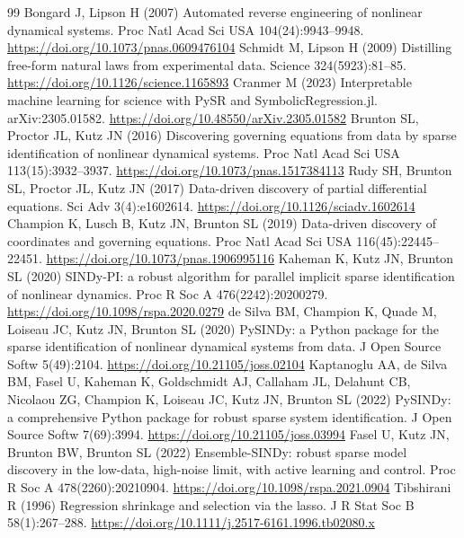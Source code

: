 \documentclass[10pt]{article}
\begin{document}
\small
\begin{thebibliography}{99}\setlength{\itemsep}{1pt}\setlength{\parskip}{0pt}
 Bongard J, Lipson H (2007) Automated reverse engineering of nonlinear dynamical systems. Proc Natl Acad Sci USA 104(24):9943--9948. \url{https://doi.org/10.1073/pnas.0609476104}
 Schmidt M, Lipson H (2009) Distilling free-form natural laws from experimental data. Science 324(5923):81--85. \url{https://doi.org/10.1126/science.1165893}
 Cranmer M (2023) Interpretable machine learning for science with PySR and SymbolicRegression.jl. arXiv:2305.01582. \url{https://doi.org/10.48550/arXiv.2305.01582}
 Brunton SL, Proctor JL, Kutz JN (2016) Discovering governing equations from data by sparse identification of nonlinear dynamical systems. Proc Natl Acad Sci USA 113(15):3932--3937. \url{https://doi.org/10.1073/pnas.1517384113}
 Rudy SH, Brunton SL, Proctor JL, Kutz JN (2017) Data-driven discovery of partial differential equations. Sci Adv 3(4):e1602614. \url{https://doi.org/10.1126/sciadv.1602614}
 Champion K, Lusch B, Kutz JN, Brunton SL (2019) Data-driven discovery of coordinates and governing equations. Proc Natl Acad Sci USA 116(45):22445--22451. \url{https://doi.org/10.1073/pnas.1906995116}
 Kaheman K, Kutz JN, Brunton SL (2020) SINDy-PI: a robust algorithm for parallel implicit sparse identification of nonlinear dynamics. Proc R Soc A 476(2242):20200279. \url{https://doi.org/10.1098/rspa.2020.0279}
 de Silva BM, Champion K, Quade M, Loiseau JC, Kutz JN, Brunton SL (2020) PySINDy: a Python package for the sparse identification of nonlinear dynamical systems from data. J Open Source Softw 5(49):2104. \url{https://doi.org/10.21105/joss.02104}
 Kaptanoglu AA, de Silva BM, Fasel U, Kaheman K, Goldschmidt AJ, Callaham JL, Delahunt CB, Nicolaou ZG, Champion K, Loiseau JC, Kutz JN, Brunton SL (2022) PySINDy: a comprehensive Python package for robust sparse system identification. J Open Source Softw 7(69):3994. \url{https://doi.org/10.21105/joss.03994}
 Fasel U, Kutz JN, Brunton BW, Brunton SL (2022) Ensemble-SINDy: robust sparse model discovery in the low-data, high-noise limit, with active learning and control. Proc R Soc A 478(2260):20210904. \url{https://doi.org/10.1098/rspa.2021.0904}
 Tibshirani R (1996) Regression shrinkage and selection via the lasso. J R Stat Soc B 58(1):267--288. \url{https://doi.org/10.1111/j.2517-6161.1996.tb02080.x}

\end{thebibliography}
\end{document}

